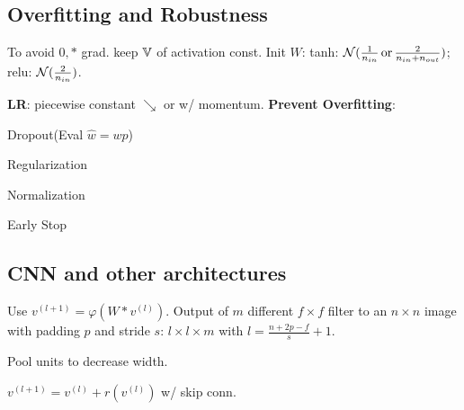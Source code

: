 \subsection*{Overfitting and Robustness}
To avoid \(0, *\) grad. keep \(\operatorname{\mathbb{V}}\) of activation const.
Init \(W\): tanh: \(\operatorname{\mathcal{N}}(\frac{1}{n_{in}} \, \text{or} \, \frac{2}{n_{in} + n_{out}})\); relu: \(\operatorname{\mathcal{N}}(\frac{2}{n_{in}})\).

\textbf{LR}: piecewise constant \(\searrow\) or w/ momentum.
\textbf{Prevent Overfitting}: \begin{itemize*}
  \item Dropout(Eval \(\hat{w} = wp\))
  \item Regularization
  \item Normalization
  \item Early Stop
\end{itemize*}

\subsection{CNN and other architectures}
Use \(v^{(l+1)} = \varphi(W * v^{(l)})\). Output of \(m\) different \(f \times f\) filter to an \(n \times n\) image with padding \(p\) and stride \(s\): \(l \times l \times m\) with \(l = \frac{n + 2p - f}{s} +1\).

\begin{definition}
  Pool units to decrease width.
\end{definition}

\begin{definition}[ResNet]
  \(v^{(l + 1)} = v^{(l)} + r(v^{(l)})\) w/ skip conn.
\end{definition}
